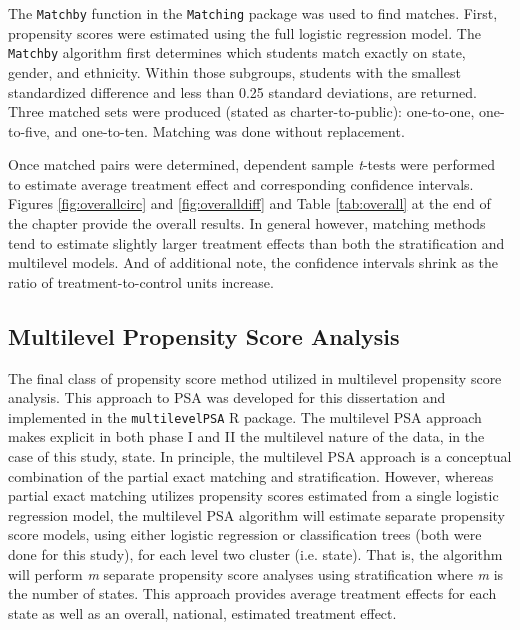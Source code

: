 \documentclass[letterpaper,12p,twoside]{article} %
\begin{document}
The \texttt{Matchby} function in the \texttt{Matching} package \cite{matching} was used to find matches. First, propensity scores were estimated using the full logistic regression model. The \texttt{Matchby} algorithm first determines which students match exactly on state, gender, and ethnicity. Within those subgroups, students with the smallest standardized difference and less than 0.25 standard deviations, are returned. Three matched sets were produced (stated as charter-to-public): one-to-one, one-to-five, and one-to-ten. Matching was done without replacement.

Once matched pairs were determined, dependent sample \textit{t}-tests were performed \cite{Austin2011} to estimate average treatment effect and corresponding confidence intervals. Figures \ref{fig:overallcirc} and \ref{fig:overalldiff} and Table \ref{tab:overall} at the end of the chapter provide the overall results. In general however, matching methods tend to estimate slightly larger treatment effects than both the stratification and multilevel models. And of additional note, the confidence intervals shrink as the ratio of treatment-to-control units increase.


\subsection{Multilevel Propensity Score Analysis}

The final class of propensity score method utilized in multilevel propensity score analysis. This approach to PSA was developed for this dissertation and implemented in the \texttt{multilevelPSA} R package. The multilevel PSA approach makes explicit in both phase I and II the multilevel nature of the data, in the case of this study, state. In principle, the multilevel PSA approach is a conceptual combination of the partial exact matching and stratification. However, whereas partial exact matching utilizes propensity scores estimated from a single logistic regression model, the multilevel PSA algorithm will estimate separate propensity score models, using either logistic regression or classification trees (both were done for this study), for each level two cluster (i.e. state). That is, the algorithm will perform \textit{m} separate propensity score analyses using stratification where \textit{m} is the number of states. This approach provides average treatment effects for each state as well as an overall, national, estimated treatment effect.
\end{document}
